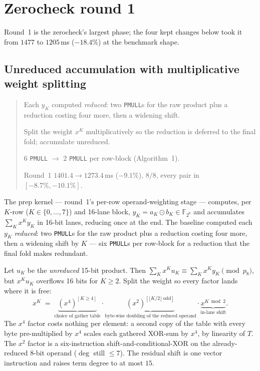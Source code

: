 \documentclass[11pt]{article}
\newcommand{\Feight}{\mathbb{F}_{2^8}}
\newcommand{\code}[1]{\texttt{#1}}
\newenvironment{optsummary}{%
  \begin{quote}\small
  \begin{description}
  \setlength{\itemsep}{1pt}\setlength{\parsep}{0pt}\setlength{\topsep}{2pt}
}{%
  \end{description}
  \end{quote}
}
\begin{document}
\section{Zerocheck round 1}

Round~1 is the zerocheck's largest phase; the four kept changes below took it
from $1477$ to $1205$\,ms ($-18.4\%$) at the benchmark shape.

\subsection{Unreduced accumulation with multiplicative weight splitting}
\label{sec:pmull}

\begin{optsummary}
\item[Baseline:] Each $y_K$ computed \emph{reduced}: two \code{PMULL}s for the raw product plus a reduction costing four more, then a widening shift.
\item[Improvement:] Split the weight $x^K$ multiplicatively so the reduction is deferred to the final fold; accumulate unreduced.
\item[Mechanism:] $6$ \code{PMULL} $\to$ $2$ \code{PMULL} per row-block (Algorithm~1).
\item[Result:] Round~1 $1401.4\to1273.4\,$ms ($-9.1\%$), $8/8$, every pair in $[-8.7\%,-10.1\%]$.
\end{optsummary}

The prep kernel --- round~1's per-row operand-weighting stage --- computes,
per $K$-row ($K\in\{0,\dots,7\}$) and 16-lane block,
$y_K = a_K \odot b_K \in \Feight$ and accumulates $\sum_K x^K y_K$ in 16-bit
lanes, reducing once at the end. The baseline computed each $y_K$
\emph{reduced}: two \code{PMULL}s for the raw product plus a reduction costing
four more, then a widening shift by $K$ --- six \code{PMULL}s per row-block for
a reduction that the final fold makes redundant.

Let $u_K$ be the \emph{unreduced} 15-bit product. Then
$\sum_K x^K u_K \equiv \sum_K x^K y_K \pmod{p_8}$, but $x^K u_K$ overflows 16
bits for $K\ge2$. Split the weight so every factor lands where it is free:
\[
x^K \;=\;
\underbrace{(x^4)^{[K\ge4]}}_{\text{choice of gather table}}\cdot
\underbrace{(x^2)^{[\lfloor K/2\rfloor\ \mathrm{odd}]}}_{\text{byte-wise
doubling of the reduced operand}}\cdot
\underbrace{x^{K\bmod 2}}_{\text{in-lane shift}}.
\]
The $x^4$ factor costs nothing per element: a second copy of the table with
every byte pre-multiplied by $x^4$ scales each gathered XOR-sum by $x^4$, by
linearity of $T$. The $x^2$ factor is a six-instruction shift-and-conditional-XOR
on the already-reduced 8-bit operand ($\deg$ still $\le7$). The residual shift
is one vector instruction and raises term degree to at most $15$.
\end{document}
